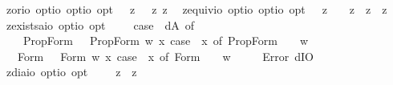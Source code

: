 \begin{isabellebody}
\isamarkupfalse%
\ z{\isacharunderscore}or{\isacharcolon}{\isacharcolon}{\isachardoublequoteopen}io\ opt{\isasymRightarrow}io\ opt{\isasymRightarrow}io\ opt{\isachardoublequoteclose}\ \ {\isachardoublequoteopen}{\isasymphi}\ {\isasymor}\isactrlsup z\ {\isasympsi}\ {\isasymequiv}\ {\isacharparenleft}{\isasymnot}\isactrlsup z{\isasymphi}\ {\isasymrightarrow}\isactrlsup z\ {\isasympsi}{\isacharparenright}{\isachardoublequoteclose}\isanewline
{}\isamarkupfalse%
\ z{\isacharunderscore}equiv{\isacharcolon}{\isacharcolon}{\isachardoublequoteopen}io\ opt{\isasymRightarrow}io\ opt{\isasymRightarrow}io\ opt{\isachardoublequoteclose}\ \ {\isachardoublequoteopen}{\isasymphi}\ {\isasymequiv}\isactrlsup z\ {\isasympsi}\ {\isasymequiv}\ {\isacharparenleft}{\isasymphi}\ {\isasymrightarrow}\isactrlsup z\ {\isasympsi}{\isacharparenright}\ {\isasymand}\isactrlsup z\ {\isacharparenleft}{\isasympsi}\ {\isasymrightarrow}\isactrlsup z\ {\isasymphi}{\isacharparenright}{\isachardoublequoteclose}\isanewline
{}\isamarkupfalse%
\ z{\isacharunderscore}exists{\isacharcolon}{\isacharcolon}{\isachardoublequoteopen}{\isacharparenleft}{\isacharprime}a{\isasymRightarrow}io\ opt{\isacharparenright}{\isasymRightarrow}io\ opt{\isachardoublequoteclose}\ \ {\isachardoublequoteopen}{\isasymexists}\ {\isasymPhi}\ {\isasymequiv}\ case\ {\isacharparenleft}{\isasymPhi}\ dA{\isacharparenright}\ of\isanewline
\ \ \ \ PropForm\ {\isasymphi}\ {\isasymRightarrow}\ PropForm\ {\isacharparenleft}{\isasymlambda}w{\isachardot}\ {\isasymexists}x{\isachardot}\ case\ {\isacharparenleft}{\isasymPhi}\ x{\isacharparenright}\ of\ PropForm\ {\isasympsi}\ {\isasymRightarrow}\ {\isasympsi}\ w{\isacharparenright}\isanewline
\ \ {\isacharbar}\ Form\ {\isasymphi}\ {\isasymRightarrow}\ Form\ {\isacharparenleft}{\isasymlambda}w{\isachardot}\ {\isasymexists}x{\isachardot}\ case\ {\isacharparenleft}{\isasymPhi}\ x{\isacharparenright}\ of\ Form\ {\isasympsi}\ {\isasymRightarrow}\ {\isasympsi}\ w{\isacharparenright}\isanewline
\ \ {\isacharbar}\ {\isacharunderscore}\ {\isasymRightarrow}\ Error\ dIO{\isachardoublequoteclose}\isanewline
{}\isamarkupfalse%
\ z{\isacharunderscore}dia{\isacharcolon}{\isacharcolon}{\isachardoublequoteopen}io\ opt{\isasymRightarrow}io\ opt{\isachardoublequoteclose}\ \ {\isachardoublequoteopen}{\isasymdiamond}\ {\isasymphi}\ {\isasymequiv}\ {\isasymnot}\isactrlsup z\ {\isacharparenleft}{\isasymbox}\ {\isacharparenleft}{\isasymnot}\isactrlsup z\ {\isasymphi}{\isacharparenright}{\isacharparenright}{\isachardoublequoteclose}%

\end{isabellebody}
